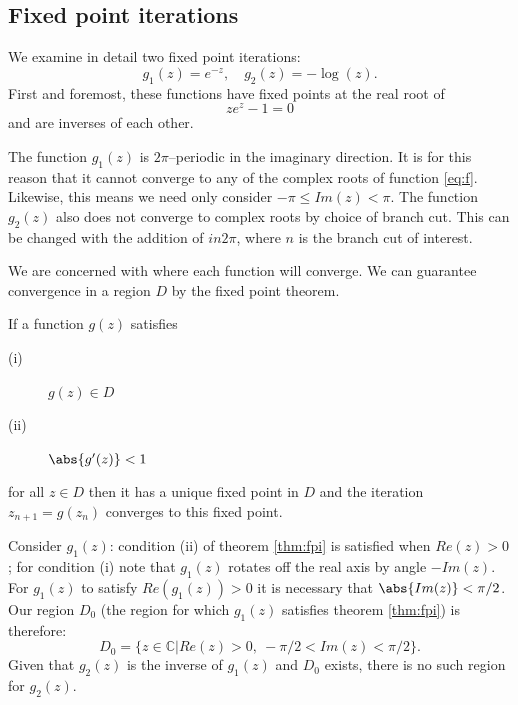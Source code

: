 \documentclass{book}
\begin{document}
\subsection{Fixed point iterations}

We examine in detail two fixed point iterations:
\begin{equation} \label{eq:FPI}
g_1(z) = e^{-z}, \quad g_2(z) = -\log(z).
\end{equation}
First and foremost, these functions have fixed points at the real root of
\begin{equation} \label{eq:f}
z e^z - 1 = 0
\end{equation}
and are inverses of each other.

The function $g_1(z)$ is $2 \pi$--periodic in the imaginary direction.
It is for this reason that it cannot converge to any of the complex roots of function \ref{eq:f}.
Likewise, this means we need only consider $-\pi \leq Im(z) < \pi$.
The function $g_2(z)$ also does not converge to complex roots by choice of branch cut.
This can be changed with the addition of $i n 2 \pi$, where $n$ is the branch cut of interest.

We are concerned with where each function will converge.
We can guarantee convergence in a region $D$ by the fixed point theorem.

\begin{thm} \label{thm:fpi}
If a function $g(z)$ satisfies
\begin{description}
\item[(i)] $g(z) \in D$
\item[(ii)] $\abs{g'(z)} < 1$
\end{description}
for all $z \in D$ then it has a unique fixed point in $D$ and the iteration $z_{n+1} = g(z_n)$ converges to this fixed point.
\end{thm}

Consider $g_1(z)$:
condition (ii) of theorem \ref{thm:fpi} is satisfied when $Re(z) > 0$;
for condition (i) note that $g_1(z)$ rotates off the real axis by angle $-Im(z)$.
For $g_1(z)$ to satisfy $Re(g_1(z)) > 0$ it is necessary that $\abs{Im(z)} < \pi/2$.
Our region $D_0$ (the region for which $g_1(z)$ satisfies theorem \ref{thm:fpi}) is therefore:
\begin{equation} \label{eq:D1}
D_0 = \{ z \in \mathbb{C} \vert Re(z) > 0, \ -\pi/2 < Im(z) < \pi/2 \} .
\end{equation}
Given that $g_2(z)$ is the inverse of $g_1(z)$ and $D_0$ exists, there is no such region for $g_2(z)$.
\end{document}
